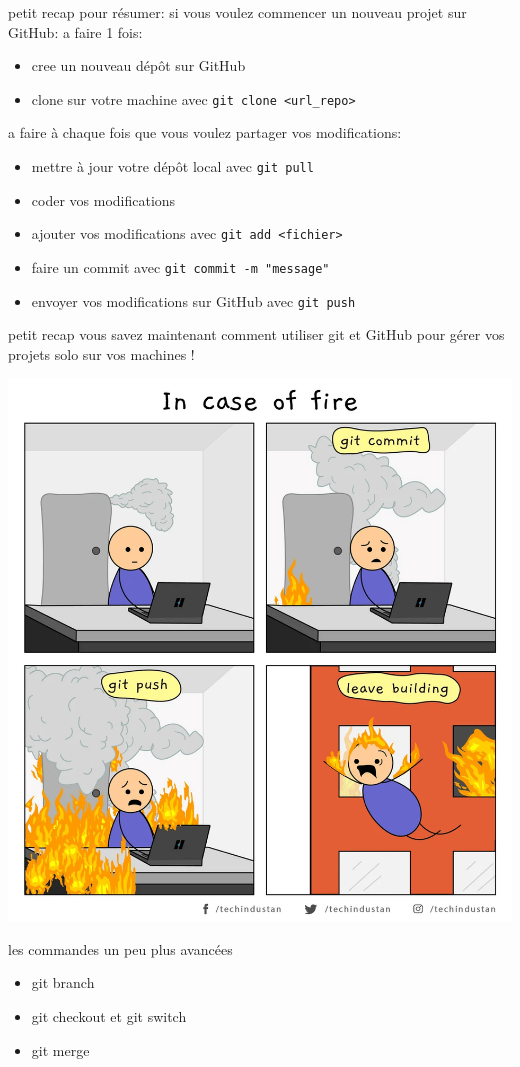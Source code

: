 \documentclass[usenames,dvipsnames]{beamer}
\begin{document}
\begin{frame}[fragile]{petit recap}
	pour résumer:
	si vous voulez commencer un nouveau projet sur GitHub:
	a faire 1 fois:
	\begin{itemize}
		\item cree un nouveau dépôt sur GitHub
		\item clone sur votre machine avec \lstinline|git clone <url_repo>|
	\end{itemize}
	a faire à chaque fois que vous voulez partager vos modifications:
	\begin{itemize}
		\item mettre à jour votre dépôt local avec \lstinline|git pull|
		\item coder vos modifications
		\item ajouter vos modifications avec \lstinline|git add <fichier>|
		\item faire un commit avec \lstinline|git commit -m "message"|
		\item envoyer vos modifications sur GitHub avec \lstinline|git push|
	\end{itemize}
\end{frame}

\begin{frame}[fragile]{petit recap}
	vous savez maintenant comment utiliser git et GitHub pour gérer vos projets solo sur vos machines !
	\begin{center}
		\includegraphics[width=0.5\linewidth]{Im/fire_git.png}
	\end{center}
\end{frame}
\begin{frame}[fragile]{les commandes un peu plus avancées}
	\begin{itemize}
		\item git branch
		\item git checkout et git switch
		\item git merge
	\end{itemize}
\end{frame}
\end{document}
